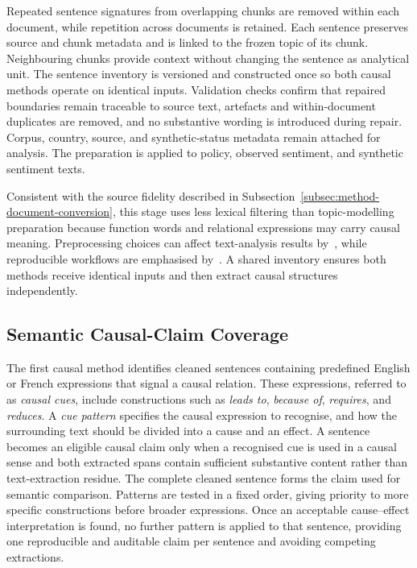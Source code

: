 Repeated sentence signatures from overlapping chunks are removed within each
document, while repetition across documents is retained. Each sentence preserves
source and chunk metadata and is linked to the frozen topic of its chunk.
Neighbouring chunks provide context without changing the sentence as analytical unit.
{\color{blue}The sentence inventory is versioned and constructed once so both causal
methods operate on identical inputs. Validation checks confirm that repaired
boundaries remain traceable to source text, artefacts and within-document duplicates
are removed, and no substantive wording is introduced during repair. Corpus, country,
source, and synthetic-status metadata remain attached for analysis.} The preparation
is applied to policy, observed sentiment, and synthetic sentiment texts.


{\color{blue}Consistent with the source fidelity described in
Subsection~\ref{subsec:method-document-conversion}, this stage uses less
lexical filtering than topic-modelling preparation because function words and
relational expressions may carry causal meaning.} Preprocessing choices can
affect text-analysis results by~\cite{denny2018preprocessing}, while
reproducible workflows are emphasised by~\cite{welbers2017text}. A shared inventory
ensures both methods receive identical inputs and then extract causal structures
independently.


\subsection{Semantic Causal-Claim Coverage}
\label{subsec:method-semantic-coverage}

The first causal method identifies cleaned sentences containing predefined English or
French expressions that signal a causal relation. These expressions, referred to as
\textit{causal cues}, include constructions such as \textit{leads to},
\textit{because of}, \textit{requires}, and \textit{reduces}. A \textit{cue pattern}
specifies the causal expression to recognise, and how the surrounding text should be
divided into a cause and an effect. A sentence becomes an eligible causal claim only
when a recognised cue is used in a causal sense and both extracted spans contain
sufficient substantive content rather than text-extraction residue. The complete
cleaned sentence forms the claim used for semantic comparison. Patterns are tested in
a fixed order, giving priority to more specific constructions before broader
expressions. Once an acceptable cause--effect interpretation is found, no further
pattern is applied to that sentence, providing one reproducible and auditable claim
per sentence and avoiding competing extractions.

